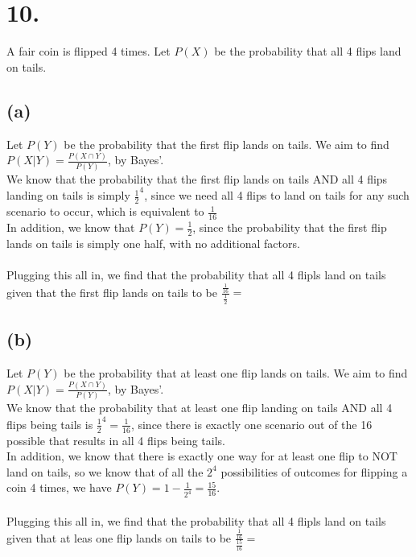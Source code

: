 \documentclass{article}
\begin{document}
\section*{10.}
{\Large 
A fair coin is flipped 4 times. Let $P(X)$ be the probability that all 4 flips land on tails.

\subsection*{(a)}
Let $P(Y)$ be the probability that the first flip lands on tails. We aim to find $P(X|Y) = \frac{P(X \cap Y)}{P(Y)}$, by Bayes'. \\
We know that the probability that the first flip lands on tails AND all 4 flips landing on tails is simply $\frac{1}{2}^4$, since we need all 4 flips to land on tails for any such scenario to occur, which is equivalent to $\frac{1}{16}$ \\
In addition, we know that $P(Y) = \frac{1}{2}$, since the probability that the first flip lands on tails is simply one half, with no additional factors. \\ \\ 
Plugging this all in, we find that the probability that all 4 flipls land on tails given that the first flip lands on tails to be $\frac{\frac{1}{16}}{\frac{1}{2}} = $ 

\subsection*{(b)}
Let $P(Y)$ be the probability that at least one flip lands on tails. We aim to find $P(X|Y) = \frac{P(X \cap Y)}{P(Y)}$, by Bayes'. \\
We know that the probability that at least one flip landing on tails AND all 4 flips being tails is $\frac{1}{2}^4 = \frac{1}{16}$, since there is exactly one scenario out of the 16 possible that results in all 4 flips being tails. \\
In addition, we know that there is exactly one way for at least one flip to NOT land on tails, so we know that of all the $2^4$ possibilities of outcomes for flipping a coin 4 times, we have $P(Y) = 1 - \frac{1}{2^4} = \frac{15}{16}$. \\ \\
Plugging this all in, we find that the probability that all 4 flipls land on tails given that at leas one flip lands on tails to be $\frac{\frac{1}{16}}{\frac{15}{16}} = $ 


}
\end{document}
